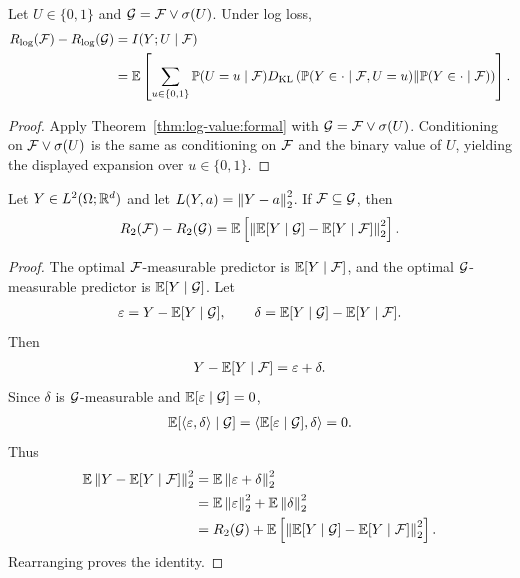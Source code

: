 \begin{corollary}
\label{cor:binary-distinction-value:formal}
Let $U\in\{0,1\}$ and $\calG=\calF\vee\sigma(U)$. Under log loss,
\begin{align*}
R_{\log}(\calF)-R_{\log}(\calG)
&=
I(Y;U\mid\calF)\\
&=
\E\left[
\sum_{u\in\{0,1\}}
\mathbb P(U=u\mid\calF)
D_{\mathrm{KL}}\left(
\mathbb P(Y\in\cdot\mid\calF,U=u)
\middle\|
\mathbb P(Y\in\cdot\mid\calF)
\right)
\right].
\end{align*}
\end{corollary}
\begin{proof}
Apply Theorem~\ref{thm:log-value:formal} with $\calG=\calF\vee\sigma(U)$. Conditioning on $\calF\vee\sigma(U)$ is the same as conditioning on $\calF$ and the binary value of $U$, yielding the displayed expansion over $u\in\{0,1\}$.
\end{proof}

\begin{theorem}
\label{thm:squared-value:formal}
Let $Y\in L^2(\Omega;\R^d)$ and let $L(Y,a)=\norm{Y-a}_2^2$. If $\calF\subseteq\calG$, then
\begin{align*}
R_2(\calF)-R_2(\calG)=\E\left[\norm{\E[Y\mid\calG]-\E[Y\mid\calF]}_2^2\right].
\end{align*}
\end{theorem}
\begin{proof}
The optimal $\calF$-measurable predictor is $\E[Y\mid\calF]$, and the optimal $\calG$-measurable predictor is $\E[Y\mid\calG]$. Let
\begin{align*}
\varepsilon=Y-\E[Y\mid\calG],\qquad \delta=\E[Y\mid\calG]-\E[Y\mid\calF].
\end{align*}
Then
\begin{align*}
Y-\E[Y\mid\calF]=\varepsilon+\delta.
\end{align*}
Since $\delta$ is $\calG$-measurable and $\E[\varepsilon\mid\calG]=0$,
\begin{align*}
\E[\ip{\varepsilon}{\delta}\mid\calG]=\ip{\E[\varepsilon\mid\calG]}{\delta}=0.
\end{align*}
Thus
\begin{align*}
\E\norm{Y-\E[Y\mid\calF]}_2^2&=\E\norm{\varepsilon+\delta}_2^2\\
&=\E\norm{\varepsilon}_2^2+\E\norm{\delta}_2^2\\
&=R_2(\calG)+\E\left[\norm{\E[Y\mid\calG]-\E[Y\mid\calF]}_2^2\right].
\end{align*}
Rearranging proves the identity.
\end{proof}

